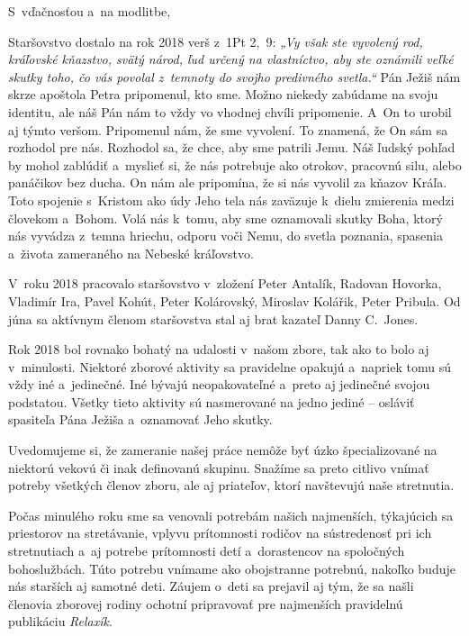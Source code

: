S~vďačnosťou a~na modlitbe,



Staršovstvo dostalo na rok 2018 verš z~1Pt 2,~9: {\it „Vy však ste vyvolený rod, kráľovské kňazstvo, svätý národ, ľud určený na vlastníctvo, aby ste oznámili veľké skutky toho, čo vás povolal z~temnoty do svojho predivného svetla.“}  Pán Ježiš nám skrze apoštola Petra pripomenul, kto sme. Možno niekedy zabúdame na svoju identitu, ale náš Pán nám to vždy vo vhodnej chvíli pripomenie. A~On to urobil aj týmto veršom. Pripomenul nám, že sme vyvolení. To znamená, že On sám sa rozhodol pre nás. Rozhodol sa, že chce, aby sme patrili Jemu. Náš ľudský pohľad by mohol zablúdiť a~myslieť si, že nás potrebuje ako otrokov, pracovnú silu, alebo panáčikov bez ducha. On nám ale pripomína, že si nás vyvolil za kňazov Kráľa. Toto spojenie s~Kristom ako údy Jeho tela nás zaväzuje k~dielu zmierenia medzi človekom a~Bohom. Volá nás k~tomu, aby sme oznamovali skutky Boha, ktorý nás vyvádza z~temna hriechu, odporu voči Nemu, do svetla poznania, spasenia a~života zameraného na Nebeské kráľovstvo.

V~roku 2018 pracovalo staršovstvo v~zložení Peter Antalík, Radovan Hovorka, Vladimír Ira, Pavel Kohút, Peter Kolárovský, Miroslav Kolářik, Peter Pribula. Od júna sa aktívnym členom staršovstva stal aj brat kazateľ Danny C.~Jones.

Rok 2018 bol rovnako bohatý na udalosti v~našom zbore, tak ako to bolo aj v~minulosti. Niektoré zborové aktivity sa pravidelne opakujú a~napriek tomu sú vždy iné a~jedinečné. Iné bývajú neopakovateľné a~preto aj jedinečné svojou podstatou. Všetky tieto aktivity sú nasmerované na jedno jediné -- osláviť spasiteľa Pána Ježiša a~oznamovať Jeho skutky.

Uvedomujeme si, že zameranie našej práce nemôže byť úzko špecializované na niektorú vekovú či inak definovanú skupinu. Snažíme sa preto citlivo vnímať potreby všetkých členov zboru, ale aj priateľov, ktorí navštevujú naše stretnutia.

Počas minulého roku sme sa venovali potrebám našich najmenších, týkajúcich sa priestorov na stretávanie, vplyvu prítomnosti rodičov na sústredenosť pri ich stretnutiach a~aj potrebe prítomnosti detí a~dorastencov na spoločných bohoslužbách. Túto potrebu vnímame ako obojstranne potrebnú, nakoľko buduje nás starších aj samotné deti. Záujem o~deti sa prejavil aj tým, že sa našli členovia zborovej rodiny ochotní pripravovať pre najmenších pravidelnú publikáciu {\it Relaxík}.

